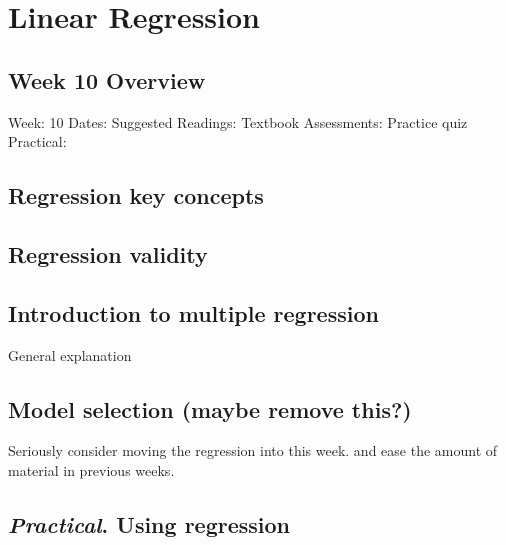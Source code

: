 \documentclass[
]{scrbook}
\begin{document}
\hypertarget{part-linear-regression}{%
\part{Linear Regression}\label{part-linear-regression}}

\hypertarget{Week10}{%
\chapter*{Week 10 Overview}\label{Week10}}

Week: 10
Dates:
Suggested Readings: Textbook
Assessments: Practice quiz
Practical:

\hypertarget{regression-key-concepts}{%
\chapter{Regression key concepts}\label{regression-key-concepts}}

\hypertarget{regression-validity}{%
\chapter{Regression validity}\label{regression-validity}}

\hypertarget{introduction-to-multiple-regression}{%
\chapter{Introduction to multiple regression}\label{introduction-to-multiple-regression}}

General explanation

\hypertarget{model-selection-maybe-remove-this}{%
\chapter{Model selection (maybe remove this?)}\label{model-selection-maybe-remove-this}}

Seriously consider moving the regression into this week. and ease the amount of material in previous weeks.

\hypertarget{practical.-using-regression}{%
\chapter{\texorpdfstring{\emph{Practical}. Using regression}{Practical. Using regression}}\label{practical.-using-regression}}
\end{document}

